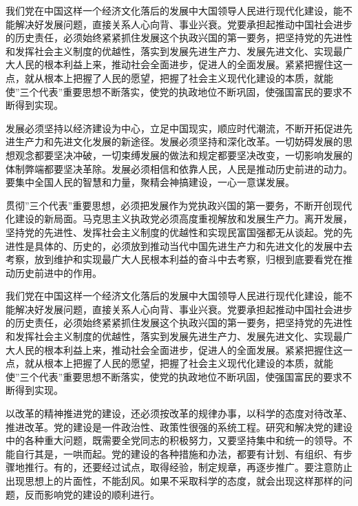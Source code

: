 \documentclass[adobefonts]{njuthesis}
\begin{document}
我们党在中国这样一个经济文化落后的发展中大国领导人民进行现代化建设，能不能解决好发展问题，直接关系人心向背、事业兴衰。党要承担起推动中国社会进步的历史责任，必须始终紧紧抓住发展这个执政兴国的第一要务，把坚持党的先进性和发挥社会主义制度的优越性，落实到发展先进生产力、发展先进文化、实现最广大人民的根本利益上来，推动社会全面进步，促进人的全面发展。紧紧把握住这一点，就从根本上把握了人民的愿望，把握了社会主义现代化建设的本质，就能使”三个代表”重要思想不断落实，使党的执政地位不断巩固，使强国富民的要求不断得到实现。 

发展必须坚持以经济建设为中心，立足中国现实，顺应时代潮流，不断开拓促进先进生产力和先进文化发展的新途径。发展必须坚持和深化改革。一切妨碍发展的思想观念都要坚决冲破，一切束缚发展的做法和规定都要坚决改变，一切影响发展的体制弊端都要坚决革除。发展必须相信和依靠人民，人民是推动历史前进的动力。要集中全国人民的智慧和力量，聚精会神搞建设，一心一意谋发展。 

贯彻”三个代表”重要思想，必须把发展作为党执政兴国的第一要务，不断开创现代化建设的新局面。马克思主义执政党必须高度重视解放和发展生产力。离开发展，坚持党的先进性、发挥社会主义制度的优越性和实现民富国强都无从谈起。党的先进性是具体的、历史的，必须放到推动当代中国先进生产力和先进文化的发展中去考察，放到维护和实现最广大人民根本利益的奋斗中去考察，归根到底要看党在推动历史前进中的作用。 

我们党在中国这样一个经济文化落后的发展中大国领导人民进行现代化建设，能不能解决好发展问题，直接关系人心向背、事业兴衰。党要承担起推动中国社会进步的历史责任，必须始终紧紧抓住发展这个执政兴国的第一要务，把坚持党的先进性和发挥社会主义制度的优越性，落实到发展先进生产力、发展先进文化、实现最广大人民的根本利益上来，推动社会全面进步，促进人的全面发展。紧紧把握住这一点，就从根本上把握了人民的愿望，把握了社会主义现代化建设的本质，就能使”三个代表”重要思想不断落实，使党的执政地位不断巩固，使强国富民的要求不断得到实现。 



\begin{acknowledgement}
以改革的精神推进党的建设，还必须按改革的规律办事，以科学的态度对待改革、推进改革。党的建设是一件政治性、政策性很强的系统工程。研究和解决党的建设中的各种重大问题，既需要全党同志的积极努力，又要坚持集中和统一的领导。不能自行其是，一哄而起。党的建设的各种措施和办法，都要有计划、有组织、有步骤地推行。有的，还要经过试点，取得经验，制定规章，再逐步推广。要注意防止出现思想上的片面性，不能刮风。如果不采取科学的态度，就会出现这样那样的问题，反而影响党的建设的顺利进行。
\end{acknowledgement}

\end{document}
